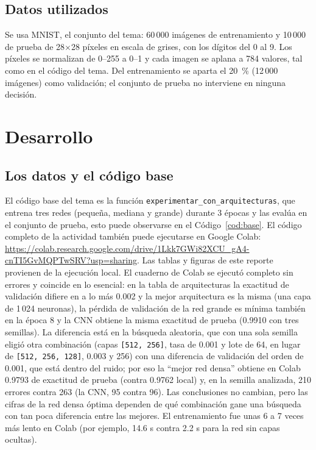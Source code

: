 \documentclass[11pt,letterpaper]{article}
\begin{document}
\subsection*{Datos utilizados}

Se usa MNIST, el conjunto del tema: 60\,000 imágenes de entrenamiento y 10\,000 de prueba de 28$\times$28 píxeles en escala de grises, con los dígitos del 0 al 9. Los píxeles se normalizan de 0--255 a 0--1 y cada imagen se aplana a 784 valores, tal como en el código del tema. Del entrenamiento se aparta el 20~\% (12\,000 imágenes) como validación; el conjunto de prueba no interviene en ninguna decisión.

\section{Desarrollo}

\subsection{Los datos y el código base}

El código base del tema es la función \texttt{experimentar\_con\_arquitecturas}, que entrena tres redes (pequeña, mediana y grande) durante 3 épocas y las evalúa en el conjunto de prueba, esto puede observarse en el Código~\ref{cod:base}. El código completo de la actividad también puede ejecutarse en Google Colab: \url{https://colab.research.google.com/drive/1Lkk7GWi82XCU_gA4-cnTI5GvMQPTwSRV?usp=sharing}. Las tablas y figuras de este reporte provienen de la ejecución local. El cuaderno de Colab se ejecutó completo sin errores y coincide en lo esencial: en la tabla de arquitecturas la exactitud de validación difiere en a lo más 0.002 y la mejor arquitectura es la misma (una capa de 1\,024 neuronas), la pérdida de validación de la red grande es mínima también en la época 8 y la CNN obtiene la misma exactitud de prueba (0.9910 con tres semillas). La diferencia está en la búsqueda aleatoria, que con una sola semilla eligió otra combinación (capas \texttt{[512, 256]}, tasa de 0.001 y lote de 64, en lugar de \texttt{[512, 256, 128]}, 0.003 y 256) con una diferencia de validación del orden de 0.001, que está dentro del ruido; por eso la ``mejor red densa'' obtiene en Colab 0.9793 de exactitud de prueba (contra 0.9762 local) y, en la semilla analizada, 210 errores contra 263 (la CNN, 95 contra 96). Las conclusiones no cambian, pero las cifras de la red densa óptima dependen de qué combinación gane una búsqueda con tan poca diferencia entre las mejores. El entrenamiento fue unas 6 a 7 veces más lento en Colab (por ejemplo, 14.6 s contra 2.2 s para la red sin capas ocultas).
\end{document}
